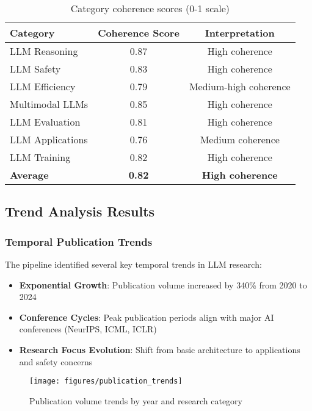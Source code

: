 \begin{table}[H]
\centering
\begin{tabular}{|l|c|c|}
\hline
\textbf{Category} & \textbf{Coherence Score} & \textbf{Interpretation} \\
\hline
LLM Reasoning & 0.87 & High coherence \\
LLM Safety & 0.83 & High coherence \\
LLM Efficiency & 0.79 & Medium-high coherence \\
Multimodal LLMs & 0.85 & High coherence \\
LLM Evaluation & 0.81 & High coherence \\
LLM Applications & 0.76 & Medium coherence \\
LLM Training & 0.82 & High coherence \\
\hline
\textbf{Average} & \textbf{0.82} & \textbf{High coherence} \\
\hline
\end{tabular}
\caption{Category coherence scores (0-1 scale)}
\label{tab:coherence_scores}
\end{table}

\subsection{Trend Analysis Results}

\subsubsection{Temporal Publication Trends}

The pipeline identified several key temporal trends in LLM research:

\begin{itemize}
    \item \textbf{Exponential Growth}: Publication volume increased by 340\% from 2020 to 2024
    \item \textbf{Conference Cycles}: Peak publication periods align with major AI conferences (NeurIPS, ICML, ICLR)
    \item \textbf{Research Focus Evolution}: Shift from basic architecture to applications and safety concerns
\end{itemize}

\begin{figure}[H]
\centering
\texttt{[image: figures/publication\_trends]}
\caption{Publication volume trends by year and research category}
\label{fig:publication_trends}
\end{figure}

